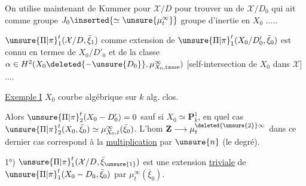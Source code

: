 
On utilise maintenant  de Kummer pour $\mathcal{X}/D$ pour trouver un  de $\mathcal{X}/D_0$ qui ait comme groupe \uline{}  $J_0\inserted{\simeq\unsure{\mu_t^\infty}}$  groupe d'inertie en $X_0$ .....



$\unsure{\Pi|\pi}_1^t(\mathcal{X}/D,\bar\xi_1)$ comme extension de $\unsure{\Pi|\pi}_1^t(X_0/D'_0,\bar\xi_0)$ est connu  en termes de $X_0/D'_0$ et de la classe $\alpha\in H^2(X_0\deleted{-\unsure{D_0}},\mu_{X_0,\mathrm{tame}}^\infty)$ [self-intersection de $X_0$ dans $\mathcal{X}$] ....

\uline{Exemple I} $X_0$ courbe algébrique sur $k$ alg. clos.

Alors $\unsure{\Pi|\pi}_2^t(X_0-D'_0)=0$ sauf si $X_0\simeq\mathbf{P}^1_k$, en quel cas $\unsure{\Pi|\pi}_2^t(X_0,\bar\xi_0)\simeq\mu_{X_0,t}^{\infty}(\bar\xi_0)$. L'hom $\mathbf{Z}\longrightarrow\mu_t^{\deleted{\unsure{2}}\infty}$ dans ce dernier cas correspond  à la \uline{multiplication} par $\unsure{n}$ (le degré). 

1°)  $\unsure{\Pi|\pi}_1^t(\mathcal{X}/D,\bar\xi_{\unsure{1}})$ est une extension \uline{triviale} de $\unsure{\Pi|\pi}_1^t(X_0-D_0,\bar\xi_0)$ par $\mu_t^\infty(\bar\xi_0)$.
